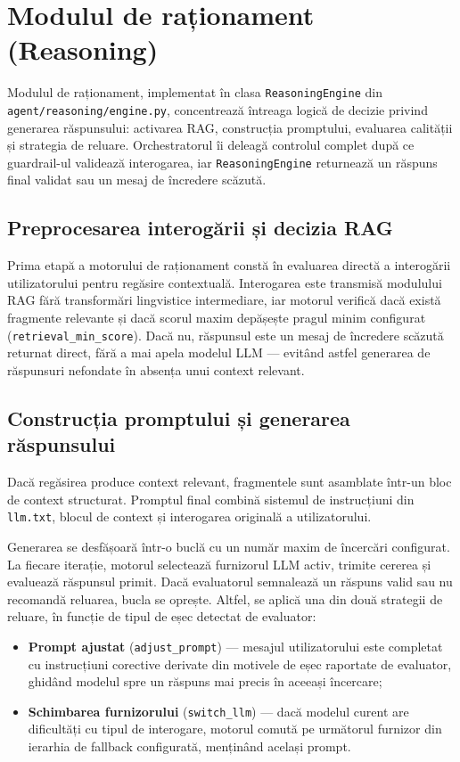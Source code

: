 \documentclass[12pt, a4paper, oneside, romanian]{teza-upb}
\begin{document}
\section{Modulul de raționament (Reasoning)}
\label{sec:reasoning}

Modulul de raționament, implementat în clasa \texttt{ReasoningEngine} din \texttt{agent/reasoning/engine.py}, concentrează întreaga logică de decizie privind generarea răspunsului: activarea RAG, construcția promptului, evaluarea calității și strategia de reluare. Orchestratorul îi deleagă controlul complet după ce guardrail-ul validează interogarea, iar \texttt{ReasoningEngine} returnează un răspuns final validat sau un mesaj de încredere scăzută.

\subsection{Preprocesarea interogării și decizia RAG}

Prima etapă a motorului de raționament constă în evaluarea directă a interogării utilizatorului pentru regăsire contextuală. Interogarea este transmisă modulului RAG fără transformări lingvistice intermediare, iar motorul verifică dacă există fragmente relevante și dacă scorul maxim depășește pragul minim configurat (\texttt{retrieval\_min\_score}). Dacă nu, răspunsul este un mesaj de încredere scăzută returnat direct, fără a mai apela modelul LLM — evitând astfel generarea de răspunsuri nefondate în absența unui context relevant.

\subsection{Construcția promptului și generarea răspunsului}

Dacă regăsirea produce context relevant, fragmentele sunt asamblate într-un bloc de context structurat. Promptul final combină sistemul de instrucțiuni din \texttt{llm.txt}, blocul de context și interogarea originală a utilizatorului.

Generarea se desfășoară într-o buclă cu un număr maxim de încercări configurat. La fiecare iterație, motorul selectează furnizorul LLM activ, trimite cererea și evaluează răspunsul primit. Dacă evaluatorul semnalează un răspuns valid sau nu recomandă reluarea, bucla se oprește. Altfel, se aplică una din două strategii de reluare, în funcție de tipul de eșec detectat de evaluator:

\begin{itemize}
    \item \textbf{Prompt ajustat} (\texttt{adjust\_prompt}) — mesajul utilizatorului este completat cu instrucțiuni corective derivate din motivele de eșec raportate de evaluator, ghidând modelul spre un răspuns mai precis în aceeași încercare;
    \item \textbf{Schimbarea furnizorului} (\texttt{switch\_llm}) — dacă modelul curent are dificultăți cu tipul de interogare, motorul comută pe următorul furnizor din ierarhia de fallback configurată, menținând același prompt.
\end{itemize}
\end{document}
